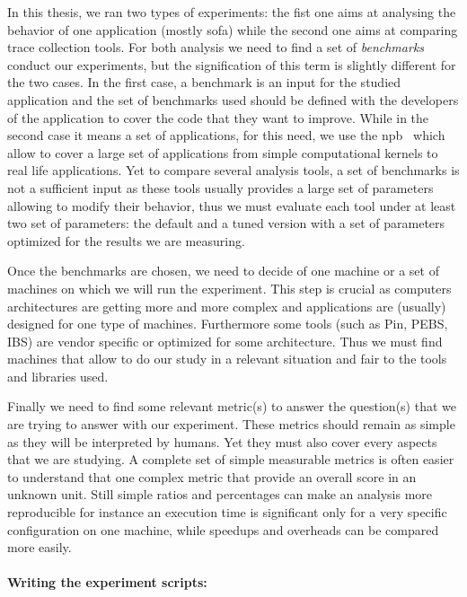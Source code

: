In this thesis, we ran two types of experiments: the fist one aims at
analysing the behavior of one application (mostly \Gls{sofa}) while the second
one aims at comparing trace collection tools. For both analysis we need to
find a set of \emph{benchmarks} conduct our experiments, but the signification
of this term is slightly different for the two cases. In the first case, a
benchmark is an input for the studied application and the set of benchmarks
used should be defined with the developers of the application to cover the
code that they want to improve. While in the second case it means a set of
applications, for this need, we use the \gls{npb}~\cite{Jin1999} which allow
to cover a large set of applications from simple computational kernels to real
life applications. Yet to compare several analysis tools, a set of benchmarks
is not a sufficient input as these tools usually provides a large set of
parameters allowing to modify their behavior, thus we must evaluate each tool
under at least two set of parameters: the default and a tuned version with a
set of parameters optimized for the results we are measuring.

Once the benchmarks are chosen, we need to decide of one machine or a set of
machines on which we will run the experiment. This step is crucial as
computers architectures are getting more and more complex  and applications are (usually) designed for one type of machines.
Furthermore some tools (such as \gls{Pin}, \gls{PEBS}, \gls{IBS}) are vendor
specific or optimized for some architecture. Thus we must find machines that
allow to do our study in a relevant situation and fair to the tools and
libraries used.

Finally we need to find some relevant metric(s) to answer the question(s) that we
are trying to answer with our experiment. These metrics should remain as
simple as they will be interpreted by humans. Yet they must also cover every
aspects that we are studying. A complete set of simple measurable metrics is
often easier to understand that one complex metric that provide an overall
score in an unknown unit. Still simple ratios and percentages can make an
analysis more reproducible for instance an execution time is significant only
for a very specific configuration on one machine, while speedups and overheads
can be compared more easily.


\paragraph{Writing the experiment scripts:}

